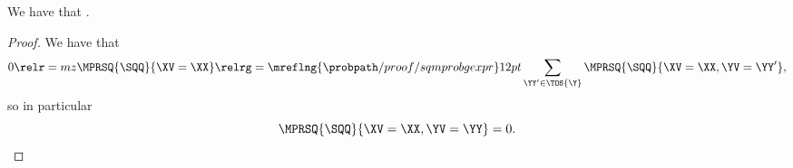 \begin{proposition}
  We have that \sqpmargzimplprop.%
\end{proposition}

\begin{proof}
  We have that
  $$0 \relr = mz \MPRSQ{\SQQ}{\XV = \XX} \relrg = {\mreflng{\probpath/proof/sqmprobgexpr}} 12pt \sum_{\YY' \in \TOS{\Y}} \MPRSQ{\SQQ}{\XV = \XX, \YV = \YY'},$$%
  so in particular 
  $$\MPRSQ{\SQQ}{\XV = \XX, \YV = \YY} = 0.$$%
\end{proof}
